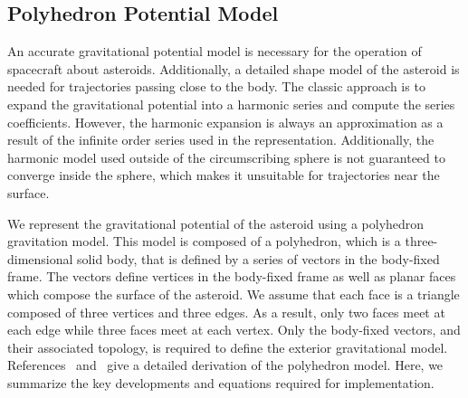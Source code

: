 \documentclass[letterpaper, paper,11pt]{AAS}		%
\begin{document}
\subsection{Polyhedron Potential Model}\label{sec:polyhedron_potential}

An accurate gravitational potential model is necessary for the operation of spacecraft about asteroids.
Additionally, a detailed shape model of the asteroid is needed for trajectories passing close to the body.
The classic approach is to expand the gravitational potential into a harmonic series and compute the series coefficients.
However, the harmonic expansion is always an approximation as a result of the infinite order series used in the representation.
Additionally, the harmonic model used outside of the circumscribing sphere is not guaranteed to converge inside the sphere, which makes it unsuitable for trajectories near the surface.

We represent the gravitational potential of the asteroid using a polyhedron gravitation model.
This model is composed of a polyhedron, which is a three-dimensional solid body, that is defined by a series of vectors in the body-fixed frame.
The vectors define vertices in the body-fixed frame as well as planar faces which compose the surface of the asteroid.
We assume that each face is a triangle composed of three vertices and three edges.
As a result, only two faces meet at each edge while three faces meet at each vertex.
Only the body-fixed vectors, and their associated topology, is required to define the exterior gravitational model.
References~ and~ give a detailed derivation of the polyhedron model.
Here, we summarize the key developments and equations required for implementation.
\end{document}
